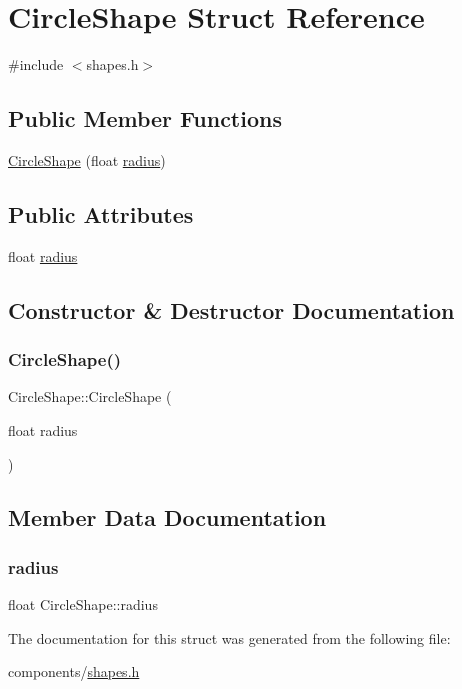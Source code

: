 \hypertarget{structCircleShape}{}\section{Circle\+Shape Struct Reference}
\label{structCircleShape}


{\ttfamily \#include $<$shapes.\+h$>$}

\subsection*{Public Member Functions}
\begin{DoxyCompactItemize}
\item 
\hyperlink{structCircleShape_a548a4dbaae0d3fb2e4e3c6a0eb61297b}{Circle\+Shape} (float \hyperlink{structCircleShape_a4f50a8ecffa8f194062a71d584338a4a}{radius})
\end{DoxyCompactItemize}
\subsection*{Public Attributes}
\begin{DoxyCompactItemize}
\item 
float \hyperlink{structCircleShape_a4f50a8ecffa8f194062a71d584338a4a}{radius}
\end{DoxyCompactItemize}


\subsection{Constructor \& Destructor Documentation}
\mbox{\label{structCircleShape_a548a4dbaae0d3fb2e4e3c6a0eb61297b}} 
\subsubsection{\texorpdfstring{Circle\+Shape()}{CircleShape()}}
{\footnotesize\ttfamily Circle\+Shape\+::\+Circle\+Shape (\begin{DoxyParamCaption}\item[{float}]{radius }\end{DoxyParamCaption})\hspace{0.3cm}{\ttfamily [inline]}}



\subsection{Member Data Documentation}
\mbox{\label{structCircleShape_a4f50a8ecffa8f194062a71d584338a4a}} 
\subsubsection{\texorpdfstring{radius}{radius}}
{\footnotesize\ttfamily float Circle\+Shape\+::radius}



The documentation for this struct was generated from the following file\+:\begin{DoxyCompactItemize}
\item 
components/\hyperlink{shapes_8h}{shapes.\+h}\end{DoxyCompactItemize}

